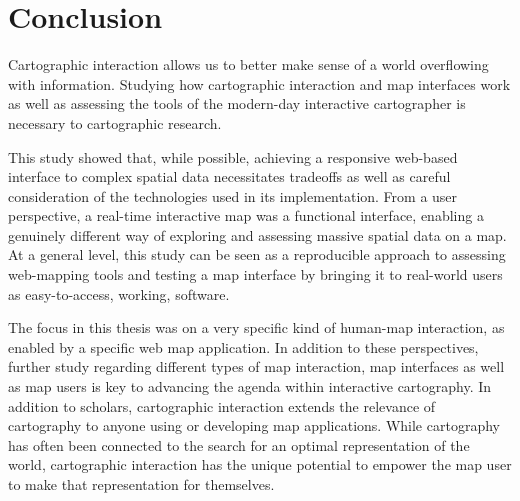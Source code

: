 \section{Conclusion}

Cartographic interaction allows us to better make sense of a world overflowing with information.
Studying how cartographic interaction and map interfaces work
as well as assessing the tools of the modern-day interactive cartographer
is necessary to cartographic research.

This study showed that, while possible, achieving a responsive web-based interface to complex spatial data
necessitates tradeoffs as well as careful consideration of the technologies used in its implementation.
From a user perspective, a real-time interactive map was a functional interface,
enabling a genuinely different way of exploring and assessing massive spatial data on a map.
At a general level,
this study can be seen as a reproducible approach to assessing web-mapping tools
and testing a map interface by bringing it to real-world users as easy-to-access,
working, software.

The focus in this thesis was on a very specific kind of human-map interaction,
as enabled by a specific web map application.
In addition to these perspectives,
further study regarding different types of map interaction, map interfaces as well as map users is key
to advancing the agenda within interactive cartography.
In addition to scholars,
cartographic interaction extends the relevance of cartography to
anyone using or developing map applications.
While cartography has often been connected to the search for
an optimal representation of the world,
cartographic interaction
has the unique potential to empower the map user to make that representation for themselves.



